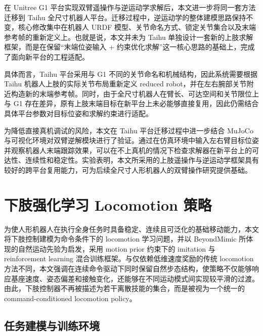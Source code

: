 在 Unitree G1 平台实现双臂遥操作与逆运动学求解后，本文进一步将同一套方法迁移到 Taihu 全尺寸机器人平台。迁移过程中，逆运动学的整体建模思路保持不变，核心修改集中在机器人 URDF 模型、关节命名方式、锁定关节集合以及末端参考帧的重新定义上。也就是说，本文并未为 Taihu 单独设计一套新的上肢求解框架，而是在保留“末端位姿输入 + 约束优化求解”这一核心思路的基础上，完成了面向新平台的工程适配。

具体而言，Taihu 平台采用与 G1 不同的关节命名和机械结构，因此系统需要根据 Taihu 机器人上肢的实际关节布局重新定义 reduced robot，并在左右腕部关节附近构造新的末端参考帧。同时，由于全尺寸机器人在臂长、可达空间和关节限位上与 G1 存在差异，原有上肢末端目标在新平台上未必能够直接复用，因此仍需结合具体平台参数对目标位姿和求解约束进行适配。

为降低直接真机调试的风险，本文在 Taihu 平台迁移过程中进一步结合 MuJoCo 与可视化环境对双臂逆解模块进行了验证。通过在仿真环境中输入左右臂目标位姿并观察机器人末端跟踪效果，可以在不上真机的情况下检查求解器在新平台上的可达性、连续性和稳定性。实验表明，本文所采用的上肢遥操作与逆运动学框架具有较好的跨平台复用能力，可为后续全尺寸人形机器人的双臂操作研究提供基础。

\section{下肢强化学习 Locomotion 策略}


为使人形机器人在执行全身任务时具备稳定、连续且可泛化的基础移动能力，本文将下肢控制建模为命令条件下的 locomotion 学习问题，并以 BeyondMimic 所体现的自然运动先验为启发，采用 motion prior 约束下的 imitation 与 reinforcement learning 混合训练框架。与仅依赖低维速度奖励的传统 locomotion 方法不同，本文强调在连续命令驱动下同时保留自然步态结构，使策略不仅能够响应基座速度、姿态偏差和接触变化，还能够在不同运动模式间实现较平滑的过渡。由此，下肢控制器不再被描述为若干离散技能的集合，而是被视为一个统一的 command-conditioned locomotion policy。


\subsection{任务建模与训练环境}

